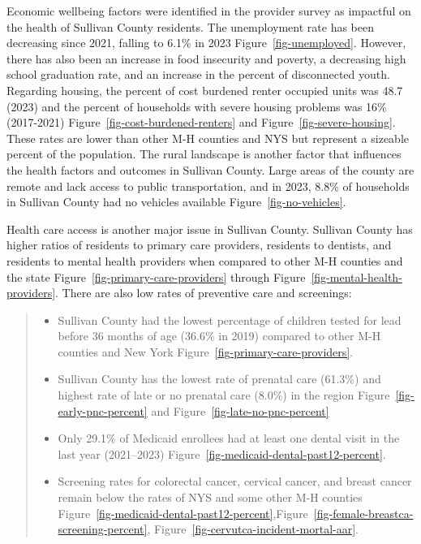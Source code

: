 \documentclass[
  english,
  letterpaper,
]{report}
\providecommand{\tightlist}{%
  \setlength{\itemsep}{0pt}\setlength{\parskip}{0pt}}
\begin{document}
Economic wellbeing factors were identified in the provider survey as
impactful on the health of Sullivan County residents. The unemployment
rate has been decreasing since 2021, falling to 6.1\% in 2023
Figure~\ref{fig-unemployed}. However, there has also been an increase in
food insecurity and poverty, a decreasing high school graduation rate,
and an increase in the percent of disconnected youth. Regarding housing,
the percent of cost burdened renter occupied units was 48.7 (2023) and
the percent of households with severe housing problems was 16\%
(2017-2021) Figure~\ref{fig-cost-burdened-renters} and
Figure~\ref{fig-severe-housing}. These rates are lower than other M-H
counties and NYS but represent a sizeable percent of the population. The
rural landscape is another factor that influences the health factors and
outcomes in Sullivan County. Large areas of the county are remote and
lack access to public transportation, and in 2023, 8.8\% of households
in Sullivan County had no vehicles available
Figure~\ref{fig-no-vehicles}.

Health care access is another major issue in Sullivan County. Sullivan
County has higher ratios of residents to primary care providers,
residents to dentists, and residents to mental health providers when
compared to other M-H counties and the state
Figure~\ref{fig-primary-care-providers} through
Figure~\ref{fig-mental-health-providers}. There are also low rates of
preventive care and screenings:

\begin{quote}
\begin{itemize}
\tightlist
\item
  Sullivan County had the lowest percentage of children tested for lead
  before 36 months of age (36.6\% in 2019) compared to other M-H
  counties and New York Figure~\ref{fig-primary-care-providers}.
\item
  Sullivan County has the lowest rate of prenatal care (61.3\%) and
  highest rate of late or no prenatal care (8.0\%) in the region
  Figure~\ref{fig-early-pnc-percent} and
  Figure~\ref{fig-late-no-pnc-percent}
\item
  Only 29.1\% of Medicaid enrollees had at least one dental visit in the
  last year (2021--2023)
  Figure~\ref{fig-medicaid-dental-past12-percent}.
\item
  Screening rates for colorectal cancer, cervical cancer, and breast
  cancer remain below the rates of NYS and some other M-H counties
  Figure~\ref{fig-medicaid-dental-past12-percent},Figure~\ref{fig-female-breastca-screening-percent},
  Figure~\ref{fig-cervutca-incident-mortal-aar}.
\end{itemize}
\end{quote}
\end{document}

